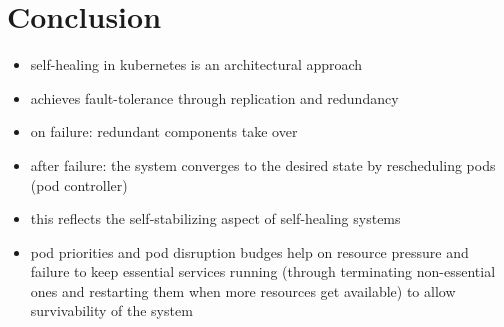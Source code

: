 
\section{Conclusion}\label{sec:conclusion}
  \begin{itemize}
    \item self-healing in \gls{kubernetes} is an architectural approach
    \item achieves fault-tolerance through replication and redundancy
    \item on failure: redundant components take over
    \item after failure: the system converges to the desired state by rescheduling pods (pod controller)
    \item this reflects the self-stabilizing aspect of self-healing systems
    \item pod priorities and pod disruption budges help on resource pressure and failure to keep essential services running (through terminating non-essential ones and restarting them when more resources get available) to allow survivability of the system
  \end{itemize}